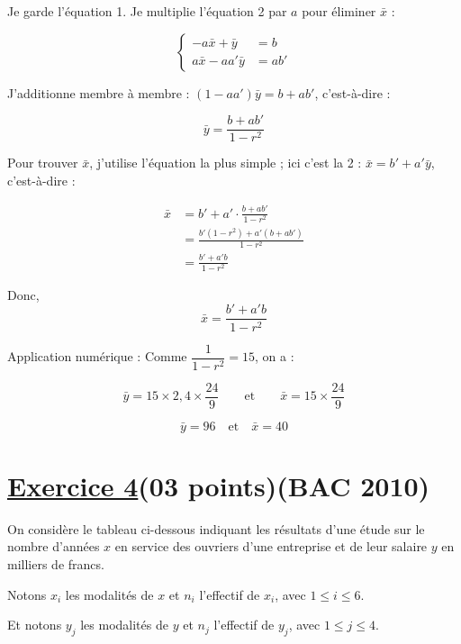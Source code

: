 \documentclass[12pt,a4paper]{article}
\begin{document}
\begin{enumerate}
Je garde l'équation 1. Je multiplie l'équation 2 par \( a \) pour éliminer \( \bar{x} \) :

\[
\left\{
\begin{aligned}
- a\bar{x} + \bar{y} &= b \\
a\bar{x} - aa'\bar{y} &= ab'
\end{aligned}
\right.
\]

J’additionne membre à membre : \( (1 - aa')\bar{y} = b + ab' \), c’est-à-dire :

\[
\bar{y} = \frac{b + ab'}{1 - r^2}
\]

Pour trouver \( \bar{x} \), j’utilise l’équation la plus simple ; ici c’est la 2 : \( \bar{x} = b' + a'\bar{y} \), c’est-à-dire :

\[
\begin{aligned}
\bar{x} &= b' + a'\cdot \frac{b + ab'}{1 - r^2} \\
       &= \frac{b'(1 - r^2) + a'(b + ab')}{1 - r^2} \\
       &= \frac{b' + a'b}{1 - r^2}
\end{aligned}
\]

Donc,
\[
\bar{x} = \frac{b' + a'b}{1 - r^2}
\]

Application numérique : Comme \( \dfrac{1}{1 - r^2} = 15 \), on a :

\[
\bar{y} = 15 \times 2{,}4 \times \frac{24}{9}
\qquad \text{et} \qquad
\bar{x} = 15 \times \frac{24}{9}
\]

\[
\boxed{\bar{y} = 96 \quad \text{et} \quad \bar{x} = 40}
\]

\end{enumerate}

\section*{\underline{Exercice 4}(03 points)(BAC 2010)}
On considère le tableau ci-dessous indiquant les résultats d’une étude sur le nombre d’années \( x \) en service des ouvriers d’une entreprise et de leur salaire \( y \) en milliers de francs.

\vspace{0.4cm}

Notons \( x_i \) les modalités de \( x \) et \( n_i \) l’effectif de \( x_i \), avec \( 1 \leq i \leq 6 \).

\vspace{0.2cm}

Et notons \( y_j \) les modalités de \( y \) et \( n_j \) l’effectif de \( y_j \), avec \( 1 \leq j \leq 4 \).
\end{document}
